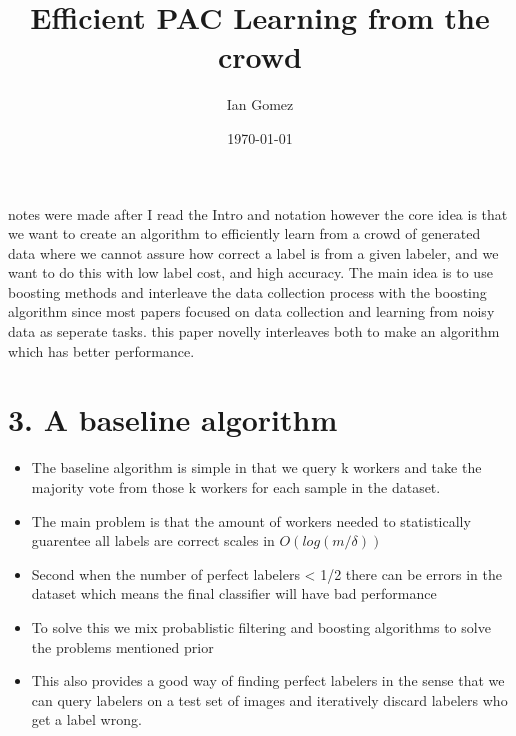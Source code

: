\documentclass[11pt]{article}
\author{Ian Gomez}
\date{\today}
\title{Efficient PAC Learning from the crowd}
\begin{document}
\maketitle
\tableofcontents

notes were made after I read the Intro and notation however the core idea is that we want to create an algorithm to efficiently learn from a crowd of generated data where we cannot assure how correct a label is from a given labeler, and we want to do this with low label cost, and high accuracy.
The main idea is to use boosting methods and interleave the data collection process with the boosting algorithm since most papers focused on data collection and learning from noisy data as seperate tasks. this paper novelly interleaves both to make an algorithm which has better performance.
\section{3. A baseline algorithm}
\label{sec:orga4b3fbb}
\begin{itemize}
\item The baseline algorithm is simple in that we query k workers and take the majority vote from those k workers for each sample in the dataset.
\item The main problem is that the amount of workers needed to statistically guarentee all labels are correct scales in \(O(log(m/\delta))\)
\item Second when the number of perfect labelers < 1/2 there can be errors in the dataset which means the final classifier will have bad performance
\item To solve this we mix probablistic filtering and boosting algorithms to solve the problems mentioned prior
\item This also provides a good way of finding perfect labelers in the sense that we can query labelers on a test set of images and iteratively discard labelers who get a label wrong.
\end{itemize}
\end{document}
